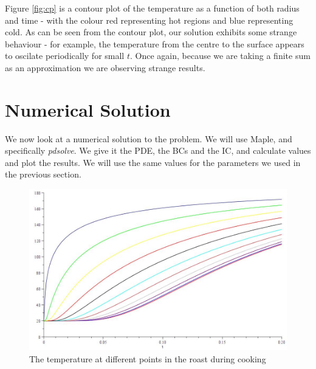 \documentclass{report}
\begin{document}
Figure \ref{fig:cp} is a contour plot of the temperature as a function of both radius and time - with the colour 
red representing hot regions and blue representing cold. As can be seen from the contour plot, our solution 
exhibits some strange behaviour - for example, the temperature from the centre to the surface appears to oscilate 
periodically for small $t$. Once again, because we are taking a finite sum as an approximation we are observing 
strange results.\bigskip





















\chapter{Numerical Solution}\label{chap:numerical-solution}

We now look at a numerical solution to the problem. We will use Maple, and specifically \emph{pdsolve}. We give it 
the PDE, the BCs and the IC, and calculate values and plot the results. We will use the same values for the parameters 
we used in the previous section.\bigskip

\begin{figure}[h]
\centering
\includegraphics[scale = 0.15]{temperature-evolution-in-time-numeric}
\caption{The temperature at different points in the roast during cooking}
\label{fig:ten}
\end{figure}
\end{document}
